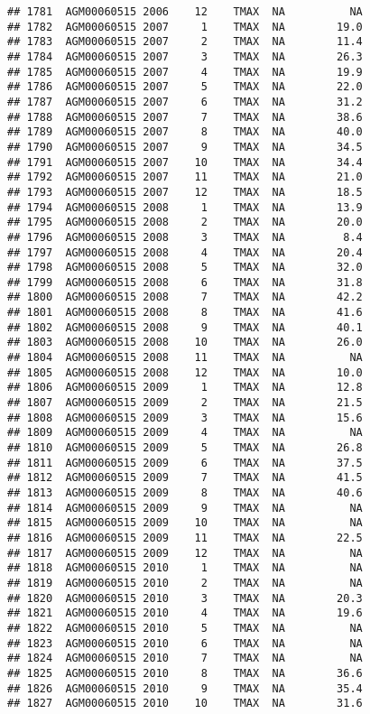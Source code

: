 \documentclass{article}\usepackage[]{graphicx}\usepackage[]{color}
\makeatletter
\newenvironment{kframe}{%
 \def\at@end@of@kframe{}%
 \ifinner\ifhmode%
  \def\at@end@of@kframe{\end{minipage}}%
  \begin{minipage}{\columnwidth}%
 \fi\fi%
 \def\FrameCommand##1{\hskip\@totalleftmargin \hskip-\fboxsep
 \colorbox{shadecolor}{##1}\hskip-\fboxsep
     \hskip-\linewidth \hskip-\@totalleftmargin \hskip\columnwidth}%
 \MakeFramed {\advance\hsize-\width
   \@totalleftmargin\z@ \linewidth\hsize
   \@setminipage}}%
 {\par\unskip\endMakeFramed%
 \at@end@of@kframe}
\newenvironment{knitrout}{}{} %
\makeatother
\begin{document}
\begin{knitrout}
\begin{kframe}
\begin{verbatim}
## 1781  AGM00060515 2006    12    TMAX  NA          NA
## 1782  AGM00060515 2007     1    TMAX  NA        19.0
## 1783  AGM00060515 2007     2    TMAX  NA        11.4
## 1784  AGM00060515 2007     3    TMAX  NA        26.3
## 1785  AGM00060515 2007     4    TMAX  NA        19.9
## 1786  AGM00060515 2007     5    TMAX  NA        22.0
## 1787  AGM00060515 2007     6    TMAX  NA        31.2
## 1788  AGM00060515 2007     7    TMAX  NA        38.6
## 1789  AGM00060515 2007     8    TMAX  NA        40.0
## 1790  AGM00060515 2007     9    TMAX  NA        34.5
## 1791  AGM00060515 2007    10    TMAX  NA        34.4
## 1792  AGM00060515 2007    11    TMAX  NA        21.0
## 1793  AGM00060515 2007    12    TMAX  NA        18.5
## 1794  AGM00060515 2008     1    TMAX  NA        13.9
## 1795  AGM00060515 2008     2    TMAX  NA        20.0
## 1796  AGM00060515 2008     3    TMAX  NA         8.4
## 1797  AGM00060515 2008     4    TMAX  NA        20.4
## 1798  AGM00060515 2008     5    TMAX  NA        32.0
## 1799  AGM00060515 2008     6    TMAX  NA        31.8
## 1800  AGM00060515 2008     7    TMAX  NA        42.2
## 1801  AGM00060515 2008     8    TMAX  NA        41.6
## 1802  AGM00060515 2008     9    TMAX  NA        40.1
## 1803  AGM00060515 2008    10    TMAX  NA        26.0
## 1804  AGM00060515 2008    11    TMAX  NA          NA
## 1805  AGM00060515 2008    12    TMAX  NA        10.0
## 1806  AGM00060515 2009     1    TMAX  NA        12.8
## 1807  AGM00060515 2009     2    TMAX  NA        21.5
## 1808  AGM00060515 2009     3    TMAX  NA        15.6
## 1809  AGM00060515 2009     4    TMAX  NA          NA
## 1810  AGM00060515 2009     5    TMAX  NA        26.8
## 1811  AGM00060515 2009     6    TMAX  NA        37.5
## 1812  AGM00060515 2009     7    TMAX  NA        41.5
## 1813  AGM00060515 2009     8    TMAX  NA        40.6
## 1814  AGM00060515 2009     9    TMAX  NA          NA
## 1815  AGM00060515 2009    10    TMAX  NA          NA
## 1816  AGM00060515 2009    11    TMAX  NA        22.5
## 1817  AGM00060515 2009    12    TMAX  NA          NA
## 1818  AGM00060515 2010     1    TMAX  NA          NA
## 1819  AGM00060515 2010     2    TMAX  NA          NA
## 1820  AGM00060515 2010     3    TMAX  NA        20.3
## 1821  AGM00060515 2010     4    TMAX  NA        19.6
## 1822  AGM00060515 2010     5    TMAX  NA          NA
## 1823  AGM00060515 2010     6    TMAX  NA          NA
## 1824  AGM00060515 2010     7    TMAX  NA          NA
## 1825  AGM00060515 2010     8    TMAX  NA        36.6
## 1826  AGM00060515 2010     9    TMAX  NA        35.4
## 1827  AGM00060515 2010    10    TMAX  NA        31.6

\end{verbatim}
\end{kframe}
\end{knitrout}
\end{document}

